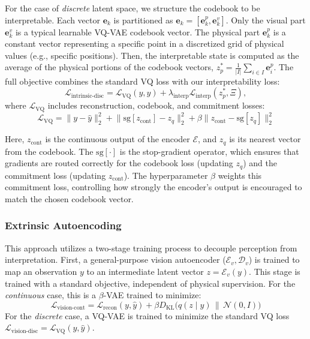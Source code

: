 \documentclass[sigconf]{acmart}
\begin{document}
For the case of \textit{discrete} latent space, we structure the codebook to be interpretable. Each vector \(\mathbf{e}_k\) is partitioned as \(\mathbf{e}_k = [\mathbf{e}_k^p, \mathbf{e}_k^v]\).  Only the visual part \(\mathbf{e}_k^v\) is a typical learnable VQ-VAE codebook vector.  The physical part \(\mathbf{e}_k^p\) is a constant vector representing a specific point in a discretized grid of physical values (e.g., specific positions). Then, the interpretable state is computed as the average of the physical portions of the codebook vectors, \( z_p^* = \frac{1}{|I|} \sum_{i \in I} \mathbf{e}_i^p \). The full objective combines the standard VQ loss with our interpretability loss:
\begin{equation}
    \mathcal{L}_{\text{intrinsic-disc}} = \mathcal{L}_{\text{VQ}}(y, \hat{y}) + \lambda_{\text{interp}}\mathcal{L}_{\text{interp}}(z_p^*, \Xi),
\end{equation}
where \(\mathcal{L}_{\text{VQ}}\) includes reconstruction, codebook, and commitment losses:
\begin{equation}
    \mathcal{L}_{\text{VQ}} = \| y - \hat{y} \|_2^2 + \big\| \text{sg}[z_{\text{cont}}] - z_q \big\|_2^2 + \beta \big\| z_{\text{cont}} - \text{sg}[z_q] \big\|_2^2
\end{equation}


Here, \(z_{\text{cont}}\) is the continuous output of the encoder \(\mathcal{E}\), and \(z_q\) is its nearest vector from the codebook. The \(\text{sg}[\cdot]\) is the stop-gradient operator, which ensures that gradients are routed correctly for the codebook loss (updating \(z_q\)) and the commitment loss (updating \(z_{\text{cont}}\)). The hyperparameter \(\beta\) weights this commitment loss, controlling how strongly the encoder's output is encouraged to match the chosen codebook vector.


\subsubsection{Extrinsic Autoencoding}


This approach utilizes a two-stage training process to decouple perception from interpretation.
First, a general-purpose vision autoencoder (\(\mathcal{E}_v, \mathcal{D}_v\)) is trained to map an observation \(y\) to an intermediate latent vector \(z = \mathcal{E}_v(y)\). This stage is trained with a standard objective, independent of physical supervision.
For the \textit{continuous} case, this is a \(\beta\)-VAE trained to minimize:
\begin{equation}
    \mathcal{L}_{\text{vision-cont}} = \mathcal{L}_{\text{recon}}(y, \hat{y}) + \beta D_{\text{KL}}\big(q(z \mid y) \,\|\, \mathcal{N}(0, I)\big)
\end{equation}
For the \textit{discrete} case, a VQ-VAE is trained to minimize the standard VQ loss \(\mathcal{L}_{\text{vision-disc}} = \mathcal{L}_{\text{VQ}}(y, \hat{y})\).
\end{document}
